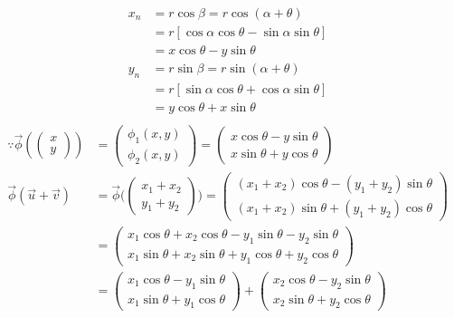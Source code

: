 \documentclass{article}
\begin{document}
\begin{enumerate}
\begin{align*}
{x_n} &= r\cos{\beta}=r\cos{(\alpha+\theta)}\\
&= r[\cos{\alpha}\cos{\theta}-\sin{\alpha}\sin{\theta}]\\
&= x\cos{\theta}-y\sin{\theta}\\
{y_n} &= r\sin{\beta} = r\sin{(\alpha+\theta)}\\
&= r[\sin{\alpha}\cos{\theta}+\cos{\alpha}\sin{\theta}]\\
&= y\cos{\theta}+x\sin{\theta}\\
\end{align*}
\begin{align*}
\because \vec{\phi}
\left(\begin{pmatrix}
 x\\y
\end{pmatrix}
\right)&=\begin{pmatrix} 
\phi_1(x,y)\\ \phi_2(x,y)
\end{pmatrix}
=\begin{pmatrix}
 x\cos\theta-y\sin{\theta}\\x\sin\theta+y\cos{\theta}
\end{pmatrix}
\\
\vec{\phi} (\Vec{u}+\Vec{v}) &=\vec{\phi}
\bigg(\begin{pmatrix}
 {x_1}+{x_2}\\
 {y_1}+{y_2}
\end{pmatrix}\bigg)
=\begin{pmatrix}
 ({x_1}+{x_2})\cos{\theta}-({y_1}+{y_2})\sin{\theta}\\
 ({x_1}+{x_2})\sin{\theta}+({y_1}+{y_2})\cos{\theta}
\end{pmatrix}
\\
&=\begin{pmatrix}
 {x_1}\cos{\theta}+{x_2}\cos{\theta}-y_1\sin{\theta}-{y_2}\sin{\theta}\\
 {x_1}\sin{\theta}+{x_2}\sin{\theta}+y_1\cos{\theta}+{y_2}\cos{\theta}
 \end{pmatrix}
 \\
 &=\begin{pmatrix}
 {x_1}\cos{\theta}-{y_1}\sin{\theta}\\{x_1}\sin{\theta}+{y_1}\cos{\theta}
\end{pmatrix}+
\begin{pmatrix}
 {x_2}\cos{\theta}-{y_2}\sin{\theta}\\{x_2}\sin\theta+y_2\cos{\theta}
\end{pmatrix}\\

\end{align*}
\end{enumerate}
\end{document}
